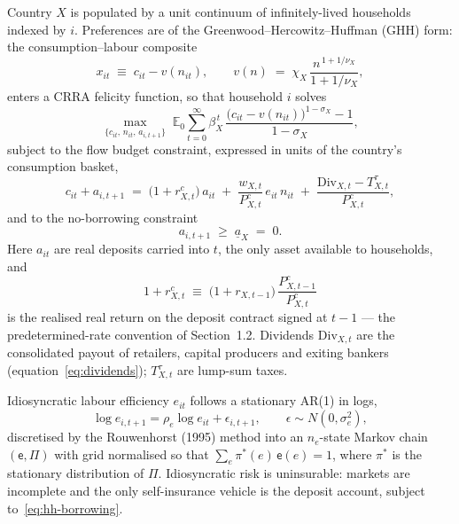 \documentclass[11pt]{article}
\numberwithin{equation}{section}
\newcommand{\E}{\mathbb{E}}
\theoremstyle{definition}
\theoremstyle{plain}
\theoremstyle{remark}
\begin{document}
Country $X$ is populated by a unit continuum of infinitely-lived households indexed
by $i$. Preferences are of the Greenwood--Hercowitz--Huffman (GHH) form: the
consumption--labour composite
\begin{equation}
x_{it}\;\equiv\;c_{it}-v(n_{it}),
\qquad
v(n)\;=\;\chi_X\,\frac{n^{\,1+1/\nu_X}}{1+1/\nu_X},
\label{eq:ghh-composite}
\end{equation}
enters a CRRA felicity function, so that household $i$ solves
\begin{equation}
\max_{\{c_{it},\,n_{it},\,a_{i,t+1}\}}\;
\E_0\sum_{t=0}^{\infty}\beta_X^{\,t}\,
\frac{\bigl(c_{it}-v(n_{it})\bigr)^{1-\sigma_X}-1}{1-\sigma_X},
\label{eq:hh-objective}
\end{equation}
subject to the flow budget constraint, expressed in units of the country's
consumption basket,
\begin{equation}
c_{it}+a_{i,t+1}
\;=\;
\bigl(1+r^{c}_{X,t}\bigr)\,a_{it}
\;+\;\frac{w_{X,t}}{P^{c}_{X,t}}\,e_{it}\,n_{it}
\;+\;\frac{\mathrm{Div}_{X,t}-T^{\tau}_{X,t}}{P^{c}_{X,t}},
\label{eq:hh-budget}
\end{equation}
and to the no-borrowing constraint
\begin{equation}
a_{i,t+1}\;\ge\;\underline{a}_X \;=\;0 .
\label{eq:hh-borrowing}
\end{equation}
Here $a_{it}$ are real deposits carried into $t$, the only asset available to
households, and
\begin{equation}
1+r^{c}_{X,t}\;\equiv\;\bigl(1+r_{X,t-1}\bigr)\,\frac{P^{c}_{X,t-1}}{P^{c}_{X,t}}
\label{eq:hh-realreturn}
\end{equation}
is the realised real return on the deposit contract signed at $t-1$ --- the
predetermined-rate convention of Section~1.2. Dividends $\mathrm{Div}_{X,t}$ are
the consolidated payout of retailers, capital producers and exiting bankers
(equation~\eqref{eq:dividends}); $T^{\tau}_{X,t}$ are lump-sum taxes.

Idiosyncratic labour efficiency $e_{it}$ follows a stationary AR(1) in logs,
\begin{equation}
\log e_{i,t+1}=\rho_e\log e_{it}+\epsilon_{i,t+1},
\qquad \epsilon\sim N(0,\sigma_e^2),
\label{eq:income-ar1}
\end{equation}
discretised by the Rouwenhorst (1995) method into an $n_e$-state Markov chain
$(\mathsf{e},\Pi)$ with grid normalised so that $\sum_e \pi^{\ast}(e)\,\mathsf{e}(e)=1$,
where $\pi^{\ast}$ is the stationary distribution of $\Pi$. Idiosyncratic risk is
uninsurable: markets are incomplete and the only self-insurance vehicle is the
deposit account, subject to~\eqref{eq:hh-borrowing}.
\end{document}
